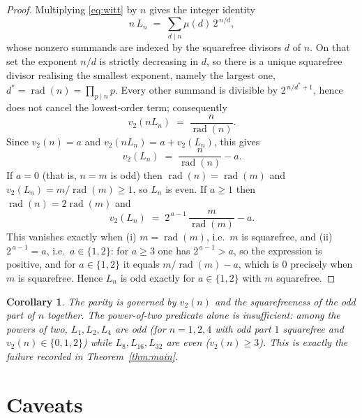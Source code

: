 \documentclass[11pt]{article}
\newtheorem{corollary}[theorem]{Corollary}
\theoremstyle{definition}
\theoremstyle{remark}
\newcommand{\vtwo}{v_2}
\begin{document}
\begin{proof}
Multiplying \eqref{eq:witt} by $n$ gives the integer identity
\[
  n\,L_n \;=\; \sum_{d\mid n} \mu(d)\, 2^{\,n/d},
\]
whose nonzero summands are indexed by the squarefree divisors $d$ of $n$. On
that set the exponent $n/d$ is strictly decreasing in $d$, so there is a unique
squarefree divisor realising the smallest exponent, namely the largest one,
$d^\ast = \operatorname{rad}(n) = \prod_{p \mid n} p$. Every other summand is
divisible by $2^{\,n/d^\ast + 1}$, hence does not cancel the lowest-order term;
consequently
\[
  \vtwo\!\left(n L_n\right) \;=\; \frac{n}{\operatorname{rad}(n)} .
\]
Since $\vtwo(n) = a$ and $\vtwo(nL_n) = a + \vtwo(L_n)$, this gives
\[
  \vtwo(L_n) \;=\; \frac{n}{\operatorname{rad}(n)} - a .
\]
If $a = 0$ (that is, $n = m$ is odd) then $\operatorname{rad}(n) =
\operatorname{rad}(m)$ and
$\vtwo(L_n) = m/\operatorname{rad}(m) \ge 1$, so $L_n$ is even. If $a \ge 1$
then $\operatorname{rad}(n) = 2\operatorname{rad}(m)$ and
\[
  \vtwo(L_n) \;=\; 2^{\,a-1}\,\frac{m}{\operatorname{rad}(m)} - a .
\]
This vanishes exactly when (i) $m = \operatorname{rad}(m)$, i.e.\ $m$ is
squarefree, and (ii) $2^{\,a-1} = a$, i.e.\ $a \in \{1,2\}$: for $a \ge 3$ one
has $2^{\,a-1} > a$, so the expression is positive, and for $a \in \{1,2\}$ it
equals $m/\operatorname{rad}(m) - a$, which is $0$ precisely when $m$ is
squarefree. Hence $L_n$ is odd exactly for
$a \in \{1,2\}$ with $m$ squarefree.
\end{proof}

\begin{corollary}
The parity is governed by $\vtwo(n)$ \emph{and} the squarefreeness of the odd
part of $n$ \emph{together}. The power-of-two predicate alone is insufficient:
among the powers of two, $L_1, L_2, L_4$ are odd (for $n = 1,2,4$ with odd part
$1$ squarefree and $\vtwo(n) \in \{0,1,2\}$) while $L_8, L_{16}, L_{32}$ are
even ($\vtwo(n) \ge 3$). This is exactly the failure recorded in
Theorem~\ref{thm:main}.
\end{corollary}

\section{Caveats}
\end{document}
